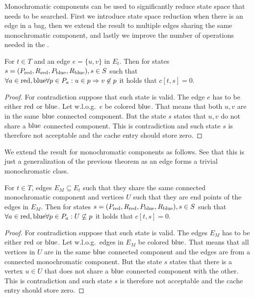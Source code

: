 Monochromatic components can be used to significantly reduce state space
that needs to be searched. First we introduce state space reduction when
there is an edge in a bag, then we extend the result to multiple edges
sharing the same monochromatic component, and lastly we improve the number of
operations needed in the \IntroduceVertexNode{}.
%
\begin{theorem}
	For \( t \in T \) and an edge \( e = \{u, v\} \) in \( E_t \).
	Then for states \( s = (P_{\text{red}}, R_{\text{red}}, P_{\text{blue}}, R_{\text{blue}}), s \in S \) such that
	\( \forall a \in {\text{red}, \text{blue}} \forall p \in P_a : u \in p \Rightarrow v \not\in p \)
	it holds that \( c[t, s] = 0 \).
\end{theorem}
%
%
\begin{proof}
	For contradiction suppose that such state is valid. The edge \( e \)
	has to be either \( \text{red} \) or \( \text{blue} \). Let w.l.o.g.\ \( e \) be colored \( \text{blue} \).
	That means that both \( u, v \) are in the same \( \text{blue} \) connected component.
	But the state \( s \) states that \( u, v \) do not share a \( \text{blue} \) connected component.
	This is contradiction and such state \( s \) is therefore not acceptable
	and the cache entry should store zero.
\end{proof}
%

We extend the result for monochromatic components as follows.
See that this is just a generalization of the previous theorem
as an edge forms a trivial monochromatic class.
%
\begin{theorem}
	For \( t \in T \),
	edges \( E_M \subseteq E_t \) such that
	they share the same connected monochromatic component
	and vertices \( U \) such that they are end points of the edges in \( E_M \).
	Then for states \( s = (P_{\text{red}}, R_{\text{red}}, P_{\text{blue}}, R_{\text{blue}}), s \in S \) such that
	\( \forall a \in {\text{red}, \text{blue}} \forall p \in P_a : U \not\subseteq p \)
	it holds that \( c[t, s] = 0 \).
\end{theorem}
%
%
\begin{proof}
	For contradiction suppose that such state is valid. The edges \( E_M \)
	has to be either \( \text{red} \) or \( \text{blue} \).
	Let w.l.o.g.\ edges in \( E_M \) be colored \( \text{blue} \).
	That means that all vertices in \( U \) are in the same \( \text{blue} \) connected component
	and the edges are from a connected monochromatic component.
	But the state \( s \) states that there is a vertex \( u \in U \)
	that does not share a \( \text{blue} \) connected component with the other.
	This is contradiction and such state \( s \) is therefore not acceptable
	and the cache entry should store zero.
\end{proof}
%


